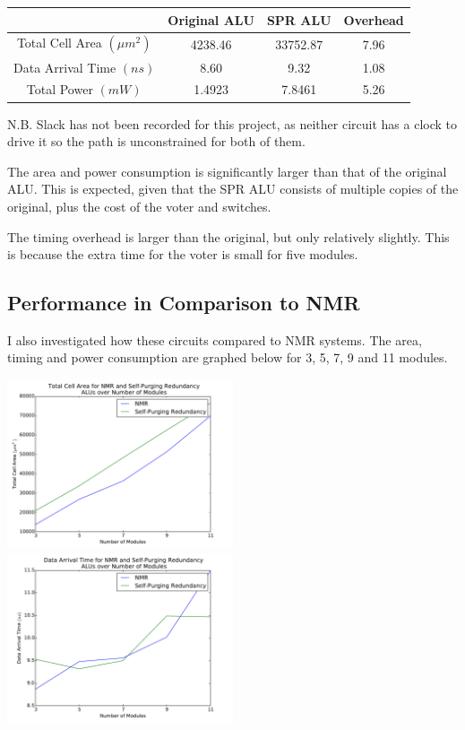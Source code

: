 \documentclass[a4paper,12pt]{article}
\begin{document}
    \begin{tabular}{|c|c|c|c|}
        \hline
        & Original ALU & SPR ALU & Overhead \\ \hline
        Total Cell Area $(\mu m^2)$ & 4238.46 & 33752.87 & 7.96 \\ \hline
        Data Arrival Time $(ns)$ & 8.60 & 9.32 & 1.08 \\ \hline
        Total Power $(mW)$ & 1.4923 & 7.8461 & 5.26 \\ \hline
    \end{tabular}

    N.B. Slack has not been recorded for this project, as neither circuit has a clock to drive it so the path is unconstrained for both of them.

    The area and power consumption is significantly larger than that of the original ALU. This is expected, given that the SPR ALU consists of multiple copies of the original, plus the cost of the voter and switches.

    The timing overhead is larger than the original, but only relatively slightly. This is because the extra time for the voter is small for five modules.

    \subsection{Performance in Comparison to NMR}
    I also investigated how these circuits compared to NMR systems. The area, timing and power consumption are graphed below for 3, 5, 7, 9 and 11 modules.

    \includegraphics[width=0.5\textwidth]{area_nmr}
    \includegraphics[width=0.5\textwidth]{time_nmr}
\end{document}
